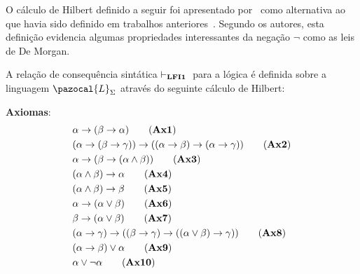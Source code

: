     O cálculo de Hilbert definido a seguir foi apresentado por~ como alternativa ao que havia sido definido em trabalhos anteriores~\cite{carnielli2000formal,carnielli2007}. Segundo os autores, esta definição evidencia algumas propriedades interessantes da negação $\neg$ como as leis de De Morgan.


    \begin{definicao}[\lfium{}]\label{def:lfi1}
        A relação de consequência sintática $\vdash_{\textbf{LFI1}{}}{}$ para a lógica \lfium{} é definida sobre a linguagem $\pazocal{L}_{\Sigma}$ através do seguinte cálculo de Hilbert:

        \noindent\textbf{Axiomas}:
        \begin{align*}
            & \alpha \to (\beta \to \alpha)\tag{\textbf{Ax1}}                                                                                     \\
            & (\alpha \to (\beta \to \gamma)) \to ((\alpha \to \beta) \to (\alpha \to \gamma ))\tag{\textbf{Ax2}} \\
            & \alpha \to (\beta \to (\alpha \land \beta))\tag{\textbf{Ax3}}                                                                       \\
            & (\alpha \land \beta) \to \alpha\tag{\textbf{Ax4}}                                                                                           \\
            & (\alpha \land \beta) \to \beta\tag{\textbf{Ax5}}                                                                                            \\
            & \alpha \to (\alpha \lor \beta)\tag{\textbf{Ax6}}                                                                                            \\
            & \beta \to (\alpha \lor \beta)\tag{\textbf{Ax7}}                                                                                             \\
            & (\alpha \to \gamma) \to ((\beta \to \gamma) \to ((\alpha \lor \beta) \to \gamma))\tag{\textbf{Ax8}}         \\
            & (\alpha \to \beta) \lor \alpha\tag{\textbf{Ax9}}                                                                                           \\
            & \alpha \lor \neg \alpha\tag{\textbf{Ax10}}                                                                                                          \\

\end{align*}
\end{definicao}
